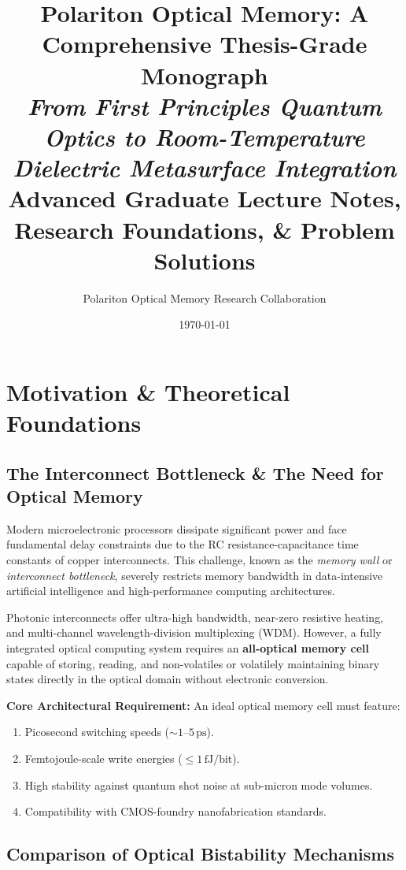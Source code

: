 \documentclass[11pt,oneside]{article}
\title{
  \Large\textbf{Polariton Optical Memory: A Comprehensive Thesis-Grade Monograph} \\[6pt]
  \large\textit{From First Principles Quantum Optics to Room-Temperature Dielectric Metasurface Integration} \\[6pt]
  \normalsize Advanced Graduate Lecture Notes, Research Foundations, \& Problem Solutions
}
\author{Polariton Optical Memory Research Collaboration}
\date{\today}
\begin{document}
\maketitle
\tableofcontents
\newpage

\section{Motivation \& Theoretical Foundations}
\label{sec:motivation}

\subsection{The Interconnect Bottleneck \& The Need for Optical Memory}

Modern microelectronic processors dissipate significant power and face fundamental delay constraints due to the RC resistance-capacitance time constants of copper interconnects. This challenge, known as the \textit{memory wall} or \textit{interconnect bottleneck}, severely restricts memory bandwidth in data-intensive artificial intelligence and high-performance computing architectures.

Photonic interconnects offer ultra-high bandwidth, near-zero resistive heating, and multi-channel wavelength-division multiplexing (WDM). However, a fully integrated optical computing system requires an \textbf{all-optical memory cell} capable of storing, reading, and non-volatiles or volatilely maintaining binary states directly in the optical domain without electronic conversion.

\begin{keybox}
\textbf{Core Architectural Requirement:} An ideal optical memory cell must feature:
\begin{enumerate}
\item Picosecond switching speeds ($\sim 1$--$5\,\text{ps}$).
\item Femtojoule-scale write energies ($\le 1\,\text{fJ/bit}$).
\item High stability against quantum shot noise at sub-micron mode volumes.
\item Compatibility with CMOS-foundry nanofabrication standards.
\end{enumerate}
\end{keybox}

\subsection{Comparison of Optical Bistability Mechanisms}
\end{document}
